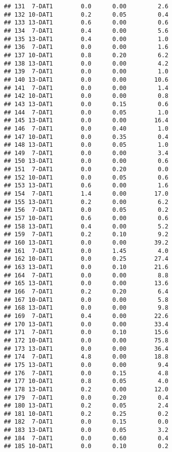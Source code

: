 \documentclass[
]{article}
\begin{document}
\begin{verbatim}
## 131  7-DAT1        0.0      0.00         2.6
## 132 10-DAT1        0.2      0.05         0.4
## 133 13-DAT1        0.6      0.00         0.6
## 134  7-DAT1        0.4      0.00         5.6
## 135 13-DAT1        0.4      0.00         1.0
## 136  7-DAT1        0.0      0.00         1.6
## 137 10-DAT1        0.8      0.20         6.2
## 138 13-DAT1        0.0      0.00         4.2
## 139  7-DAT1        0.0      0.00         1.0
## 140 13-DAT1        0.0      0.00        10.6
## 141  7-DAT1        0.0      0.00         1.4
## 142 10-DAT1        0.0      0.00         0.8
## 143 13-DAT1        0.0      0.15         0.6
## 144  7-DAT1        0.0      0.05         1.0
## 145 13-DAT1        0.0      0.00        16.4
## 146  7-DAT1        0.0      0.40         1.0
## 147 10-DAT1        0.0      0.35         0.4
## 148 13-DAT1        0.0      0.05         1.0
## 149  7-DAT1        0.0      0.00         3.4
## 150 13-DAT1        0.0      0.00         0.6
## 151  7-DAT1        0.0      0.20         0.0
## 152 10-DAT1        0.0      0.05         0.6
## 153 13-DAT1        0.6      0.00         1.6
## 154  7-DAT1        1.4      0.00        17.0
## 155 13-DAT1        0.2      0.00         6.2
## 156  7-DAT1        0.0      0.05         0.2
## 157 10-DAT1        0.6      0.00         0.6
## 158 13-DAT1        0.4      0.00         5.2
## 159  7-DAT1        0.2      0.10         9.2
## 160 13-DAT1        0.0      0.00        39.2
## 161  7-DAT1        0.0      1.45         4.0
## 162 10-DAT1        0.0      0.25        27.4
## 163 13-DAT1        0.0      0.10        21.6
## 164  7-DAT1        0.0      0.00         8.8
## 165 13-DAT1        0.0      0.00        13.6
## 166  7-DAT1        0.2      0.20         6.4
## 167 10-DAT1        0.0      0.00         5.8
## 168 13-DAT1        0.0      0.00         9.8
## 169  7-DAT1        0.4      0.00        22.6
## 170 13-DAT1        0.0      0.00        33.4
## 171  7-DAT1        0.0      0.10        15.6
## 172 10-DAT1        0.0      0.00        75.8
## 173 13-DAT1        0.0      0.00        36.4
## 174  7-DAT1        4.8      0.00        18.8
## 175 13-DAT1        0.0      0.00         9.4
## 176  7-DAT1        0.0      0.15         4.8
## 177 10-DAT1        0.8      0.05         4.0
## 178 13-DAT1        0.2      0.00        12.0
## 179  7-DAT1        0.0      0.20         0.4
## 180 13-DAT1        0.2      0.05         2.4
## 181 10-DAT1        0.2      0.25         0.2
## 182  7-DAT1        0.0      0.15         0.0
## 183 13-DAT1        0.0      0.05         3.2
## 184  7-DAT1        0.0      0.60         0.4
## 185 10-DAT1        0.0      0.10         0.2

\end{verbatim}
\end{document}
